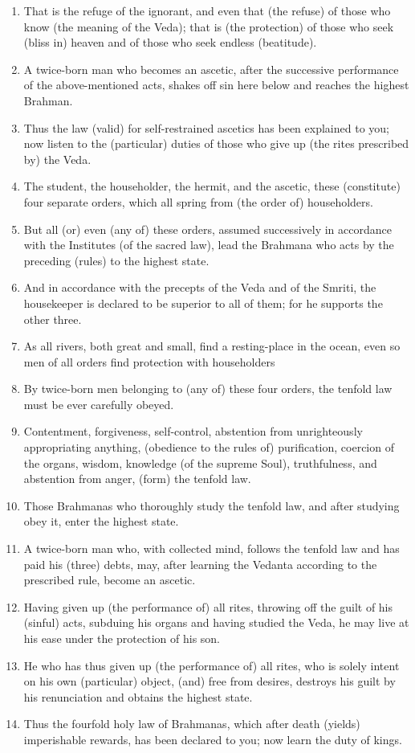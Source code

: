 \begin{enumerate}
\item That is the refuge of the ignorant, and even that (the refuse) of those who know (the meaning of the Veda); that is (the protection) of those who seek (bliss in) heaven and of those who seek endless (beatitude).
\item A twice-born man who becomes an ascetic, after the successive performance of the above-mentioned acts, shakes off sin here below and reaches the highest Brahman.
\item Thus the law (valid) for self-restrained ascetics has been explained to you; now listen to the (particular) duties of those who give up (the rites prescribed by) the Veda.
\item The student, the householder, the hermit, and the ascetic, these (constitute) four separate orders, which all spring from (the order of) householders.
\item But all (or) even (any of) these orders, assumed successively in accordance with the Institutes (of the sacred law), lead the Brahmana who acts by the preceding (rules) to the highest state.
\item And in accordance with the precepts of the Veda and of the Smriti, the housekeeper is declared to be superior to all of them; for he supports the other three.
\item As all rivers, both great and small, find a resting-place in the ocean, even so men of all orders find protection with householders
\item By twice-born men belonging to (any of) these four orders, the tenfold law must be ever carefully obeyed.
\item Contentment, forgiveness, self-control, abstention from unrighteously appropriating anything, (obedience to the rules of) purification, coercion of the organs, wisdom, knowledge (of the supreme Soul), truthfulness, and abstention from anger, (form) the tenfold law.
\item Those Brahmanas who thoroughly study the tenfold law, and after studying obey it, enter the highest state.
\item A twice-born man who, with collected mind, follows the tenfold law and has paid his (three) debts, may, after learning the Vedanta according to the prescribed rule, become an ascetic.
\item Having given up (the performance of) all rites, throwing off the guilt of his (sinful) acts, subduing his organs and having studied the Veda, he may live at his ease under the protection of his son.
\item He who has thus given up (the performance of) all rites, who is solely intent on his own (particular) object, (and) free from desires, destroys his guilt by his renunciation and obtains the highest state.
\item Thus the fourfold holy law of Brahmanas, which after death (yields) imperishable rewards, has been declared to you; now learn the duty of kings.
\end{enumerate}
